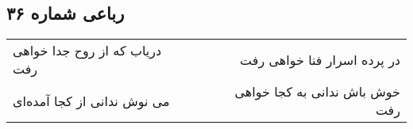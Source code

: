 \begin{center}
\section*{رباعی شماره ۳۶}
\label{sec:sh036}
\begin{longtable}{l p{0.5cm} r}
دریاب که از روح جدا خواهی رفت
&&
در پرده اسرار فنا خواهی رفت
\\
می نوش ندانی از کجا آمده‌ای
&&
خوش باش ندانی به کجا خواهی رفت
\\
\end{longtable}
\end{center}
